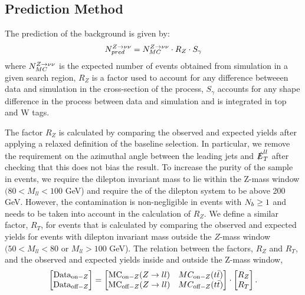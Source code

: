 \subsection{Prediction Method}\label{subsec:znunupred}

The prediction of the \Znunu{} background is given by:
\begin{equation}
N_{pred}^{Z\rightarrow\nu\nu}=N_{MC}^{Z\rightarrow\nu\nu} \cdot R_Z \cdot S_\gamma
\end{equation}
where $N_{MC}^{Z\rightarrow\nu\nu}$ is the expected number of \Znunu{} events obtained from simulation in a given search region, $R_Z$ is a factor used to account for any difference betweeen data and simulation in the cross-section of the \Znunu{} process, $S_\gamma$ accounts for any shape difference in the \Znunu{} process between data and simulation and is integrated in top and W tags. 

The factor $R_Z$ is calculated by comparing the observed and expected \Zll{} yields after applying a relaxed definition of the baseline selection. In particular, we remove the requirement on the azimuthal angle between the leading jets and $\slashed{E}_{T}^{ll}$ after checking that this does not bias the result. To increase the purity of the sample in \Zll{} events, we require the dilepton invariant mass to lie within the Z-mass window $(80<M_{ll}<100$ GeV) and require the \pt{} of the dilepton system to be above 200 GeV. However, the \ttbar{} contamination is non-negligible in events with $N_{b}\geq1$ and needs to be taken into account in the calculation of $R_Z$. We define a similar factor, $R_T$, for \ttbar{} events that is calculated by comparing the observed and expected yields for events with dilepton invariant mass outside the $Z$-mass window $(50<M_{ll}<80$ or $M_{ll}>100$ GeV). The relation between the factors, $R_Z$ and $R_T$, and the observed and expected yields inside and outside the Z-mass window, 
\begin{equation}
\begin{bmatrix}
\text{Data}_{\text{on}-Z} \\
\text{Data}_{\text{off}-Z}
\end{bmatrix}
=
\begin{bmatrix}
\text{MC}_{\text{on}-Z}(Z\rightarrow ll) & MC_{\text{on}-Z}(t\bar{t}) \\
\text{MC}_{\text{off}-Z}(Z\rightarrow ll) & MC_{\text{off}-Z}(t\bar{t})
\end{bmatrix}
\cdot
\begin{bmatrix}
R_Z \\
R_T
\end{bmatrix}.
\end{equation}

